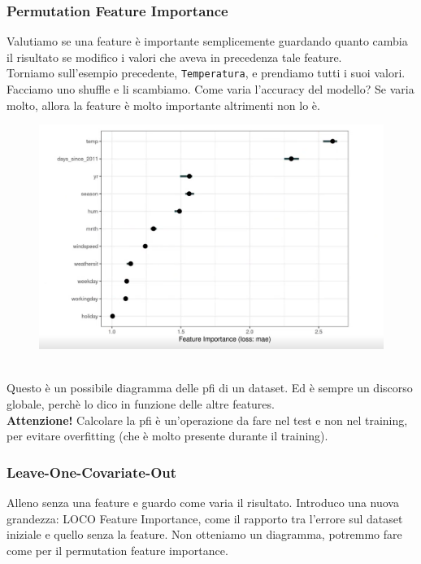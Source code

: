 \subsubsection{Permutation Feature Importance}
Valutiamo se una feature è importante semplicemente guardando quanto cambia il risultato se modifico i valori che aveva in precedenza tale feature. 
\\
Torniamo sull'esempio precedente, \texttt{Temperatura}, e prendiamo tutti i suoi valori. Facciamo uno shuffle e li scambiamo. Come varia l'accuracy del modello? Se varia molto, allora la feature è molto importante altrimenti non lo è. 
\\
\begin{figure}[th]
    \centering
    \includegraphics[scale=0.4]{ExplainableAI/img/pfi.png}
\end{figure}
\\
Questo è un possibile diagramma delle pfi di un dataset. Ed è sempre un discorso globale, perchè lo dico in funzione delle altre features. 
\\
\textbf{Attenzione!} Calcolare la pfi è un'operazione da fare nel test e non nel training, per evitare overfitting (che è molto presente durante il training). 

\subsubsection{Leave-One-Covariate-Out}
Alleno senza una feature e guardo come varia il risultato. Introduco una nuova grandezza: LOCO Feature Importance, come il rapporto tra l'errore sul dataset iniziale e quello senza la feature. Non otteniamo un diagramma, potremmo fare come per il permutation feature importance. 

